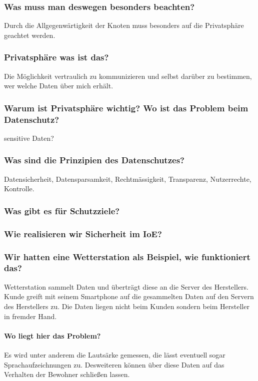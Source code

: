 	\subsubsection{Was muss man deswegen besonders beachten?}
		Durch die Allgegenwärtigkeit der Knoten muss besonders auf die Privatsphäre geachtet werden.
		
	\subsubsection{Privatsphäre was ist das?}
	Die Möglichkeit vertraulich zu kommunizieren und selbst darüber zu bestimmen, wer welche Daten über mich erhält.
	
	\subsubsection{Warum ist Privatsphäre wichtig? Wo ist das Problem beim Datenschutz?}
	sensitive Daten?
	
	\subsubsection{Was sind die Prinzipien des Datenschutzes?}
	Datensicherheit, Datensparsamkeit, Rechtmässigkeit, Transparenz, Nutzerrechte, Kontrolle.
		
	\subsubsection{Was gibt es für Schutzziele?}
	
	\subsubsection{Wie realisieren wir Sicherheit im IoE?}
	
	\subsubsection{Wir hatten eine Wetterstation als Beispiel, wie funktioniert das?}
	Wetterstation sammelt Daten und überträgt diese an die Server des Herstellers. Kunde greift mit seinem Smartphone auf die gesammelten Daten auf den Servern des Herstellers zu. Die Daten liegen nicht beim Kunden sondern beim Hersteller in fremder Hand.
	\paragraph{Wo liegt hier das Problem?}
		Es wird unter anderem die Lautsärke gemessen, die lässt eventuell sogar Sprachaufzeichnungen zu. Desweiteren können über diese Daten auf das Verhalten der Bewohner schließen lassen.
